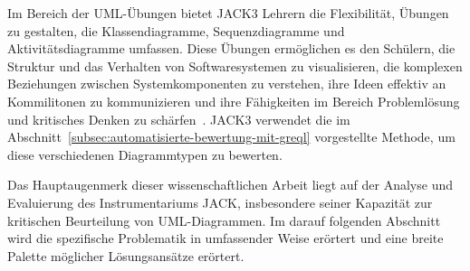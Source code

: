 Im Bereich der UML-Übungen bietet JACK3 Lehrern die Flexibilität, Übungen zu gestalten, die Klassendiagramme,
Sequenzdiagramme und Aktivitätsdiagramme umfassen. Diese Übungen ermöglichen es den Schülern, die Struktur und das
Verhalten von Softwaresystemen zu visualisieren, die komplexen Beziehungen zwischen Systemkomponenten zu verstehen,
ihre Ideen effektiv an Kommilitonen zu kommunizieren und ihre Fähigkeiten im Bereich Problemlösung und kritisches
Denken zu schärfen~\cite{jack}. JACK3 verwendet die im Abschnitt~\ref{subsec:automatisierte-bewertung-mit-greql}
vorgestellte Methode, um diese verschiedenen Diagrammtypen zu bewerten.


Das Hauptaugenmerk dieser wissenschaftlichen Arbeit liegt auf der Analyse und Evaluierung des Instrumentariums JACK,
insbesondere seiner Kapazität zur kritischen Beurteilung von UML-Diagrammen. Im darauf folgenden Abschnitt wird die
spezifische Problematik in umfassender Weise erörtert und eine breite Palette möglicher Lösungsansätze erörtert.